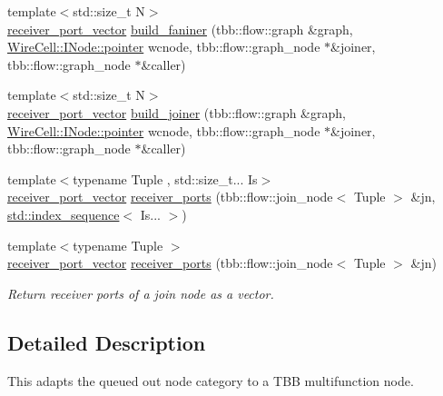 \begin{DoxyCompactItemize}
\item 
{\footnotesize template$<$std\+::size\+\_\+t N$>$ }\\\hyperlink{namespace_wire_cell_tbb_a87f42fe8a3ccc3bf9d315cb2d252c7af}{receiver\+\_\+port\+\_\+vector} \hyperlink{namespace_wire_cell_tbb_a9288a235bfd20c9cecbac374684b9fc3}{build\+\_\+faniner} (tbb\+::flow\+::graph \&graph, \hyperlink{class_wire_cell_1_1_interface_a09c548fb8266cfa39afb2e74a4615c37}{Wire\+Cell\+::\+I\+Node\+::pointer} wcnode, tbb\+::flow\+::graph\+\_\+node $\ast$\&joiner, tbb\+::flow\+::graph\+\_\+node $\ast$\&caller)
\item 
{\footnotesize template$<$std\+::size\+\_\+t N$>$ }\\\hyperlink{namespace_wire_cell_tbb_a87f42fe8a3ccc3bf9d315cb2d252c7af}{receiver\+\_\+port\+\_\+vector} \hyperlink{namespace_wire_cell_tbb_ab99dbcf9cc9065475d9b911ace3dd2b2}{build\+\_\+joiner} (tbb\+::flow\+::graph \&graph, \hyperlink{class_wire_cell_1_1_interface_a09c548fb8266cfa39afb2e74a4615c37}{Wire\+Cell\+::\+I\+Node\+::pointer} wcnode, tbb\+::flow\+::graph\+\_\+node $\ast$\&joiner, tbb\+::flow\+::graph\+\_\+node $\ast$\&caller)
\item 
{\footnotesize template$<$typename Tuple , std\+::size\+\_\+t... Is$>$ }\\\hyperlink{namespace_wire_cell_tbb_a87f42fe8a3ccc3bf9d315cb2d252c7af}{receiver\+\_\+port\+\_\+vector} \hyperlink{namespace_wire_cell_tbb_a6ecb68802302619dd9900975162a0354}{receiver\+\_\+ports} (tbb\+::flow\+::join\+\_\+node$<$ Tuple $>$ \&jn, \hyperlink{structstd_1_1index__sequence}{std\+::index\+\_\+sequence}$<$ Is... $>$)
\item 
{\footnotesize template$<$typename Tuple $>$ }\\\hyperlink{namespace_wire_cell_tbb_a87f42fe8a3ccc3bf9d315cb2d252c7af}{receiver\+\_\+port\+\_\+vector} \hyperlink{namespace_wire_cell_tbb_ad0cab88f6e89c84bde6bbea2bff842e9}{receiver\+\_\+ports} (tbb\+::flow\+::join\+\_\+node$<$ Tuple $>$ \&jn)
\begin{DoxyCompactList}\small\item\em Return receiver ports of a join node as a vector. \end{DoxyCompactList}\end{DoxyCompactItemize}


\subsection{Detailed Description}
This adapts the queued out node category to a T\+BB multifunction node.

